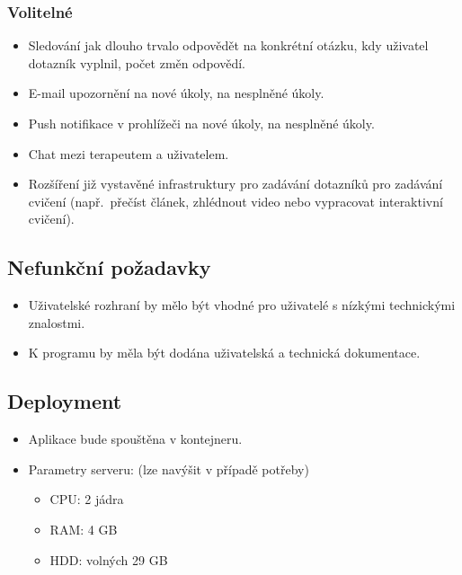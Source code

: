 \subsubsection{Volitelné}

\begin{itemize}
\item
  Sledování jak dlouho trvalo odpovědět na konkrétní otázku, kdy uživatel dotazník vyplnil, počet změn odpovědí.
\item
  E-mail upozornění na nové úkoly, na nesplněné úkoly.
\item
  Push notifikace v prohlížeči na nové úkoly, na nesplněné úkoly.
\item
  Chat mezi terapeutem a uživatelem.
\item
  Rozšíření již vystavěné infrastruktury pro zadávání dotazníků pro zadávání cvičení (např.\ přečíst článek, zhlédnout video nebo vypracovat interaktivní cvičení).
\end{itemize}


\subsection{Nefunkční požadavky}\label{subsec:nefunkcni-pozadavky}

\begin{itemize}
\item
Uživatelské rozhraní by mělo být vhodné pro uživatelé s nízkými technickými znalostmi.
\item
  K programu by měla být dodána uživatelská a technická dokumentace.
\end{itemize}


\subsection{Deployment}\label{subsec:deployment}

\begin{itemize}
\item
  Aplikace bude spouštěna v kontejneru.
\item
  Parametry serveru: (lze navýšit v případě potřeby)

  \begin{itemize}
  \item
    CPU: 2 jádra
  \item
    RAM: 4 GB
  \item
    HDD: volných 29 GB
  \end{itemize}
\end{itemize}


